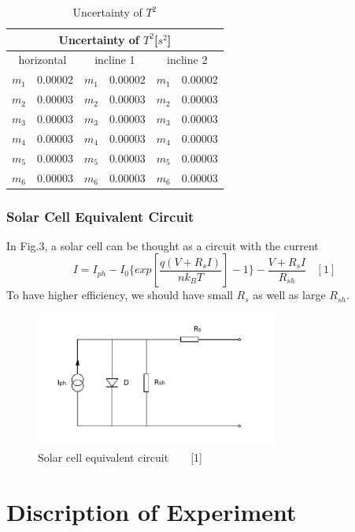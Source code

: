 \documentclass[12pt,a4paper]{article}
\begin{document}
\begin{table}[H]
    \centering
    \begin{tabular}{|c|c||c|c|c|c|}\hline
    \multicolumn{6}{|c|}{Uncertainty of $T^2$[$s^2$]}\\\hline 
    \multicolumn{2}{|c||}{horizontal}&\multicolumn{2}{c|}{incline 1}&\multicolumn{2}{c|}{incline 2}\\\hline
    $m_1$&0.00002 &$m_1$& 0.00002 & $m_1$&0.00002 \\\hline
    $m_2$&0.00003 & $m_2$&0.00003 & $m_2$&0.00003 \\\hline
    $m_3$&0.00003 &$m_3$& 0.00003 & $m_3$&0.00003 \\\hline
    $m_4$&0.00003 & $m_4$&0.00003 & $m_4$&0.00003 \\\hline
    $m_5$&0.00003 & $m_5$&0.00003 & $m_5$&0.00003 \\\hline
    $m_6$&0.00003 & $m_6$&0.00003 & $m_6$&0.00003\\\hline
    \end{tabular}
    \caption{Uncertainty of $T^2$}
    \label{Tsquare}
\end{table}

\subsubsection{Solar Cell Equivalent Circuit}
In Fig.3, a solar cell can be thought as a circuit with the current
\begin{equation*}
    I=I_{ph}-I_0\{exp[\frac{q(V+R_sI)}{nk_BT}]-1\}-\frac{V+R_sI}{R_{sh}}~~~~[1]
\end{equation*}
To have higher efficiency, we should have small $R_s$ as well as large $R_{sh}$.
\begin{figure}[H]
    \centering
    \includegraphics[width=8cm]{equivalent.png}
    \caption{Solar cell equivalent circuit~~~~[1]}
\end{figure}


\section{Discription of Experiment}
\end{document}
